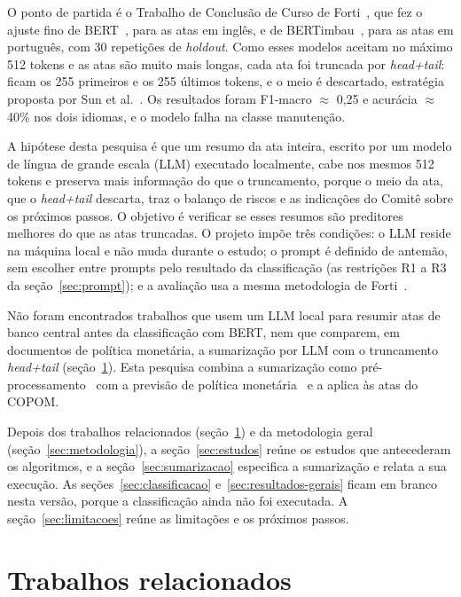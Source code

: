 \documentclass[12pt]{article}
\begin{document}
O ponto de partida é o Trabalho de Conclusão de Curso de Forti~\cite{forti2025},
que fez o ajuste fino de BERT~\cite{devlin2019}, para as atas em inglês, e de
BERTimbau~\cite{souza2020}, para as atas em português, com 30 repetições de
\textit{holdout}. Como esses modelos aceitam no máximo 512 tokens e as atas são
muito mais longas, cada ata foi truncada por \textit{head+tail}: ficam os 255
primeiros e os 255 últimos tokens, e o meio é descartado, estratégia proposta
por Sun et al.~\cite{sun2019}. Os resultados foram F1-macro ${\approx}$ 0,25 e
acurácia ${\approx}$ 40\% nos dois idiomas, e o modelo falha na classe
manutenção.

A hipótese desta pesquisa é que um resumo da ata inteira, escrito por um modelo
de língua de grande escala (LLM) executado localmente, cabe nos mesmos 512
tokens e preserva mais informação do que o truncamento, porque o meio da ata,
que o \textit{head+tail} descarta, traz o balanço de riscos e as indicações do
Comitê sobre os próximos passos. O objetivo é verificar se esses resumos são
preditores melhores do que as atas truncadas. O projeto impõe três condições: o
LLM reside na máquina local e não muda durante o estudo; o prompt é definido de
antemão, sem escolher entre prompts pelo resultado da classificação (as
restrições R1 a R3 da seção~\ref{sec:prompt}); e a avaliação usa a mesma
metodologia de Forti~\cite{forti2025}.

Não foram encontrados trabalhos que usem um LLM local para resumir atas de
banco central antes da classificação com BERT, nem que comparem, em documentos
de política monetária, a sumarização por LLM com o truncamento
\textit{head+tail} (seção~\ref{sec:relacionados}). Esta pesquisa combina a
sumarização como pré-processamento~\cite{mutasodirin2024} com a previsão de
política monetária~\cite{shah2023,fasolo2022} e a aplica às atas do COPOM.

Depois dos trabalhos relacionados (seção~\ref{sec:relacionados}) e da
metodologia geral (seção~\ref{sec:metodologia}), a seção~\ref{sec:estudos}
reúne os estudos que antecederam os algoritmos, e a
seção~\ref{sec:sumarizacao} especifica a sumarização e relata a sua execução.
As seções~\ref{sec:classificacao} e~\ref{sec:resultados-gerais} ficam em branco
nesta versão, porque a classificação ainda não foi executada. A
seção~\ref{sec:limitacoes} reúne as limitações e os próximos passos.

\section{Trabalhos relacionados}\label{sec:relacionados}
\end{document}
